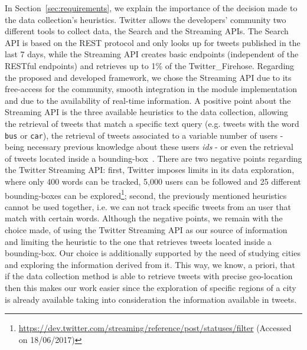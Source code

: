 In Section~\ref{sec:requirements}, we explain the importance of the decision made to the data collection's heuristics. Twitter allows the developers' community two different tools to collect data, the Search and the Streaming \glspl{API}. The Search \gls{API} is based on the \gls{REST} protocol and only looks up for tweets published in the last 7 days, while the Streaming \gls{API} creates basic endpoints (independent of the \gls{REST}ful endpoints) and retrieves up to 1\% of the \gls{Twitter_Firehose}. Regarding the proposed and developed framework, we chose the Streaming \gls{API} due to its free-access for the community, smooth integration in the module implementation and due to the availability of real-time information. A positive point about the Streaming \gls{API} is the three available heuristics to the data collection, allowing the retrieval of tweets that match a specific text query (e.g. tweets with the word \texttt{bus} or \texttt{car}), the retrieval of tweets associated to a variable  number of users - being necessary previous knowledge about these users \textit{ids} - or even the retrieval of tweets located inside a bounding-box~\cite{mac2016effects}. There are two negative points regarding the Twitter Streaming \gls{API}: first, Twitter imposes limits in its data exploration, where only 400 words can be tracked, 5,000 users can be followed and 25 different bounding-boxes can be explored\footnote{\url{https://dev.twitter.com/streaming/reference/post/statuses/filter} (Accessed on 18/06/2017)}; second, the previously mentioned heuristics cannot be used together, i.e. we can not track specific tweets from an user that match with certain words. Although the negative points, we remain with the choice made, of using the Twitter Streaming \gls{API} as our source of information and limiting the heuristic to the one that retrieves tweets located inside a bounding-box. Our choice is additionally supported by the need of studying cities and exploring the information derived from it. This way, we know, a priori, that if the data collection method is able to retrieve tweets with precise geo-location then this makes our work easier since the exploration of specific regions of a city is already available taking into consideration the information available in tweets.

